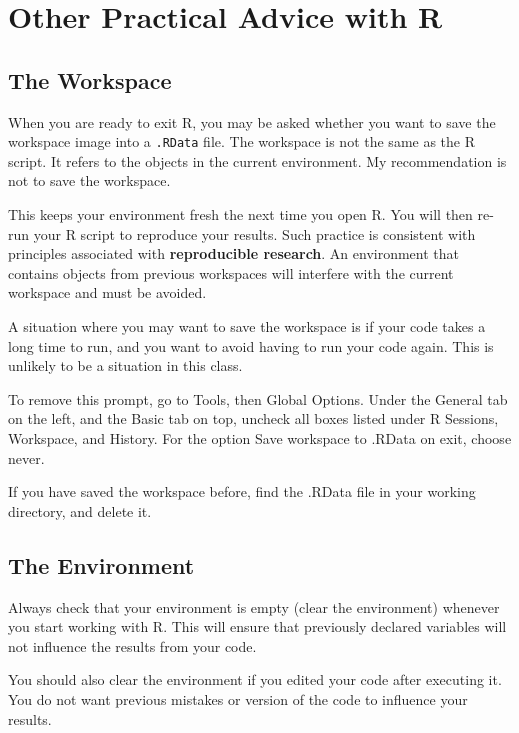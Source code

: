 \documentclass[
]{book}
\theoremstyle{definition}
\theoremstyle{definition}
\theoremstyle{definition}
\theoremstyle{definition}
\theoremstyle{remark}
\begin{document}
\hypertarget{other-practical-advice-with-r}{%
\section{Other Practical Advice with R}\label{other-practical-advice-with-r}}

\hypertarget{the-workspace}{%
\subsection{The Workspace}\label{the-workspace}}

When you are ready to exit R, you may be asked whether you want to save the workspace image into a \texttt{.RData} file. The workspace is not the same as the R script. It refers to the objects in the current environment. My recommendation is not to save the workspace.

This keeps your environment fresh the next time you open R. You will then re-run your R script to reproduce your results. Such practice is consistent with principles associated with \textbf{reproducible research}. An environment that contains objects from previous workspaces will interfere with the current workspace and must be avoided.

A situation where you may want to save the workspace is if your code takes a long time to run, and you want to avoid having to run your code again. This is unlikely to be a situation in this class.

To remove this prompt, go to Tools, then Global Options. Under the General tab on the left, and the Basic tab on top, uncheck all boxes listed under R Sessions, Workspace, and History. For the option Save workspace to .RData on exit, choose never.

If you have saved the workspace before, find the .RData file in your working directory, and delete it.

\hypertarget{the-environment}{%
\subsection{The Environment}\label{the-environment}}

Always check that your environment is empty (clear the environment) whenever you start working with R. This will ensure that previously declared variables will not influence the results from your code.

You should also clear the environment if you edited your code after executing it. You do not want previous mistakes or version of the code to influence your results.
\end{document}
